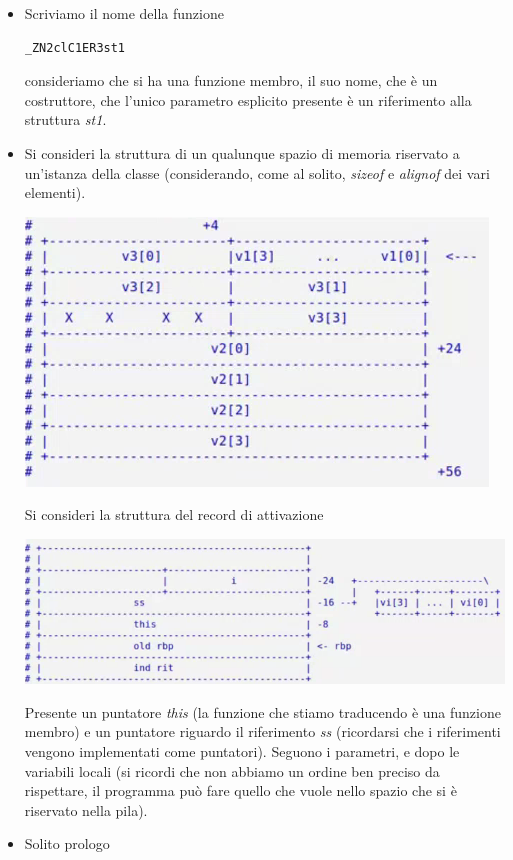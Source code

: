 \documentclass[11pt]{report}
\theoremstyle{definition}
\begin{document}
\begin{itemize}
\item Scriviamo il nome della funzione
\begin{verbatim}
_ZN2clC1ER3st1
\end{verbatim}
consideriamo che si ha una funzione membro, il suo nome, che è un costruttore, che l'unico parametro esplicito presente è un riferimento alla struttura \emph{st1}.
\item Si consideri la struttura di un qualunque spazio di memoria riservato a un'istanza della classe (considerando, come al solito, \emph{sizeof} e \emph{alignof} dei vari elementi).
\begin{center}
\includegraphics{img/46.PNG}
\end{center}  
Si consideri la struttura del record di attivazione
\begin{center}
\includegraphics{img/47.PNG}
\end{center}  
Presente un puntatore \emph{this} (la funzione che stiamo traducendo è una funzione membro) e un puntatore riguardo il riferimento \emph{ss} (ricordarsi che i riferimenti vengono implementati come puntatori). Seguono i parametri, e dopo le variabili locali (si ricordi che non abbiamo un ordine ben preciso da rispettare, il programma può fare quello che vuole nello spazio che si è riservato nella pila).
\item Solito prologo
\begin{verbatim}

\end{verbatim}
\end{itemize}
\end{document}

